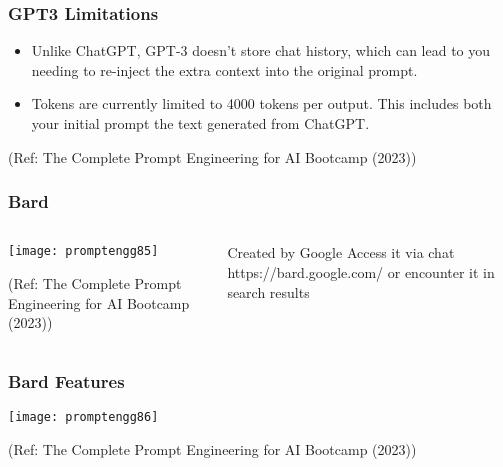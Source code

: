 \begin{frame}[fragile]\frametitle{GPT3 Limitations}




\begin{itemize}
\item  Unlike ChatGPT, GPT-3 doesn’t store chat history, which can lead to you needing to re-inject the extra context into the
original prompt.
\item Tokens are currently limited to 4000 tokens per output. This includes both your initial prompt the text generated
from ChatGPT.

\end{itemize}	 

{\tiny (Ref: The Complete Prompt Engineering for AI Bootcamp (2023))}

\end{frame}


\begin{frame}[fragile]\frametitle{Bard}


\begin{columns}
    \begin{column}[T]{0.6\linewidth}
		\begin{center}
		\texttt{[image: promptengg85]}

		{\tiny (Ref: The Complete Prompt Engineering for AI Bootcamp (2023))}
		\end{center}	
    \end{column}
    \begin{column}[T]{0.4\linewidth}
		Created by Google
		Access it via chat https://bard.google.com/ or encounter it in search results
    \end{column}
  \end{columns}
\end{frame}

\begin{frame}[fragile]\frametitle{Bard Features}


		\begin{center}
		\texttt{[image: promptengg86]}

		{\tiny (Ref: The Complete Prompt Engineering for AI Bootcamp (2023))}
		\end{center}	

\end{frame}

